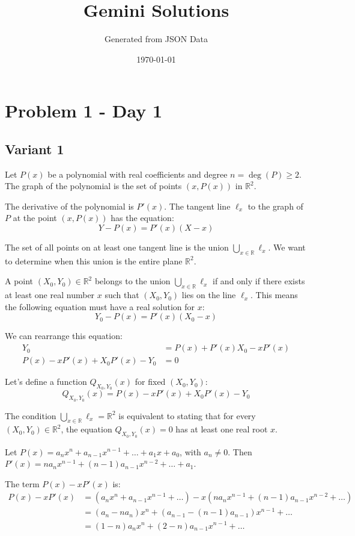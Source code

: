 \documentclass[12pt,a4paper]{article}
\title{Gemini Solutions}
\author{Generated from JSON Data}
\date{\today}
\theoremstyle{definition}
\begin{document}
    \maketitle
    \tableofcontents
    \newpage


\section{Problem 1 - Day 1}

\subsection{Variant 1}

Let $P(x)$ be a polynomial with real coefficients and degree $n = \deg(P) \geq 2$. The graph of the polynomial is the set of points $(x, P(x))$ in $\mathbb{R}^2$.

The derivative of the polynomial is $P'(x)$.
The tangent line $\ell_x$ to the graph of $P$ at the point $(x, P(x))$ has the equation:
\[Y - P(x) = P'(x)(X - x)\]

The set of all points on at least one tangent line is the union $\bigcup_{x \in \mathbb{R}} \ell_x$. We want to determine when this union is the entire plane $\mathbb{R}^2$.

A point $(X_0, Y_0) \in \mathbb{R}^2$ belongs to the union $\bigcup_{x \in \mathbb{R}} \ell_x$ if and only if there exists at least one real number $x$ such that $(X_0, Y_0)$ lies on the line $\ell_x$. This means the following equation must have a real solution for $x$:
\[Y_0 - P(x) = P'(x)(X_0 - x)\]

We can rearrange this equation:
\begin{align}
Y_0 &= P(x) + P'(x)X_0 - xP'(x)\\
P(x) - xP'(x) + X_0 P'(x) - Y_0 &= 0
\end{align}

Let's define a function $Q_{X_0, Y_0}(x)$ for fixed $(X_0, Y_0)$:
\[Q_{X_0, Y_0}(x) = P(x) - xP'(x) + X_0 P'(x) - Y_0\]

The condition $\bigcup_{x \in \mathbb{R}} \ell_x = \mathbb{R}^2$ is equivalent to stating that for every $(X_0, Y_0) \in \mathbb{R}^2$, the equation $Q_{X_0, Y_0}(x) = 0$ has at least one real root $x$.

Let $P(x) = a_n x^n + a_{n-1} x^{n-1} + \dots + a_1 x + a_0$, with $a_n \neq 0$.
Then $P'(x) = n a_n x^{n-1} + (n-1) a_{n-1} x^{n-2} + \dots + a_1$.

The term $P(x) - xP'(x)$ is:
\begin{align}
P(x) - xP'(x) &= (a_n x^n + a_{n-1} x^{n-1} + \dots) - x(n a_n x^{n-1} + (n-1) a_{n-1} x^{n-2} + \dots)\\
&= (a_n - n a_n) x^n + (a_{n-1} - (n-1)a_{n-1}) x^{n-1} + \dots\\
&= (1-n) a_n x^n + (2-n) a_{n-1} x^{n-1} + \dots
\end{align}
\end{document}
